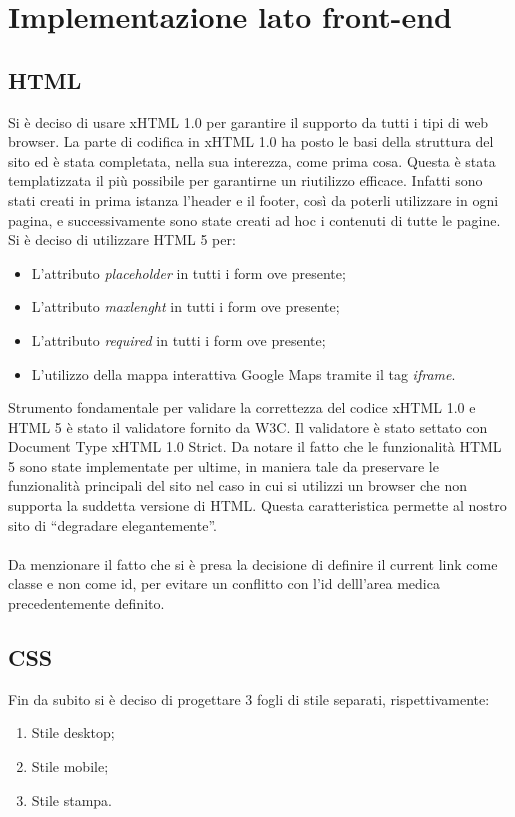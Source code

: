 \section{Implementazione lato front-end}
\label{frontend}

\subsection{HTML}
Si è deciso di usare xHTML 1.0 per garantire il supporto da tutti i tipi di web browser.
La parte di codifica in xHTML 1.0 ha posto le basi della struttura del sito ed è stata completata, nella sua interezza, come prima cosa.
Questa è stata templatizzata il più possibile per garantirne un riutilizzo efficace. Infatti sono stati creati in prima istanza l’header e il footer, così da poterli utilizzare in ogni pagina, e successivamente sono state creati ad hoc i contenuti di tutte le pagine.
Si è deciso di utilizzare HTML 5 per: 
\begin{itemize}
\item L’attributo \textit{placeholder} in tutti i form ove presente;
\item L’attributo \textit{maxlenght} in tutti i form ove presente;
\item L’attributo \textit{required} in tutti i form ove presente;
\item L’utilizzo della mappa interattiva Google Maps tramite il tag \textit{iframe}.
\end{itemize}

Strumento fondamentale per validare la correttezza del codice xHTML 1.0 e HTML 5 è stato il validatore fornito da W3C. Il validatore è stato settato con Document Type xHTML 1.0 Strict.
Da notare il fatto che le funzionalità HTML 5 sono state implementate per ultime, in maniera tale da preservare le funzionalità principali del sito nel caso in cui si utilizzi un browser che non supporta la suddetta versione di HTML. Questa caratteristica permette al nostro sito di “degradare elegantemente”.
\\
\\
Da menzionare il fatto che si è presa la decisione di definire il current link come classe e non come id, per evitare un conflitto con l’id delll’area medica precedentemente definito.

\subsection{CSS}
Fin da subito si è deciso di progettare 3 fogli di stile separati, rispettivamente: 
\begin{enumerate}
\item Stile desktop;
\item Stile mobile;
\item Stile stampa.
\end{enumerate}

